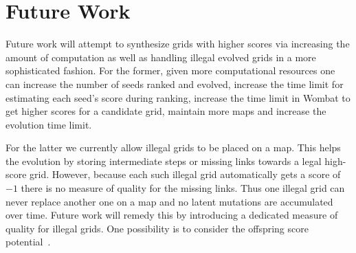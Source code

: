 \section{Future Work}

Future work will attempt to synthesize grids with higher scores via increasing the amount of computation as well as handling illegal evolved grids in a more sophisticated fashion. For the former, given more computational resources one can increase the number of seeds ranked and evolved, increase the time limit for estimating each seed's score during ranking, increase the time limit in {\sc Wombat} to get higher scores for a candidate grid, maintain more maps and increase the evolution time limit. 

For the latter we currently allow illegal grids to be placed on a map. This helps the evolution by storing intermediate steps or missing links towards a legal high-score grid. However, because each such illegal grid automatically gets a score of $-1$ there is no measure of quality for the missing links. Thus one illegal grid can never replace another one on a map and no latent mutations are accumulated over time. Future work will remedy this by introducing a dedicated measure of quality for illegal grids. One possibility is to consider the offspring score potential~\cite{FI2Pop,FI2Pop2}.